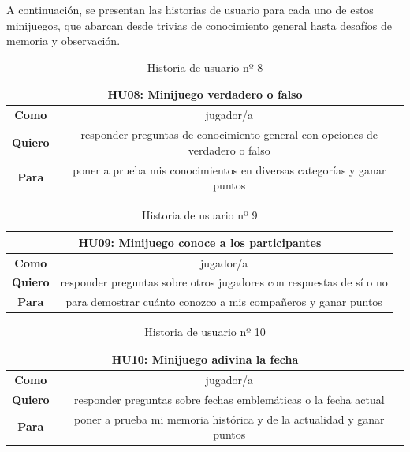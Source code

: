 A continuación, se presentan las historias de usuario para cada uno de estos minijuegos, que abarcan desde trivias de conocimiento general hasta desafíos de memoria y observación.

\begin{table}[H]
	\centering
	\begin{tabular}{|c|c|}
		\hline
		\multicolumn{2}{|c|}{\textbf{HU08}: Minijuego verdadero o falso} \\
		\hline
		\textbf{Como} & jugador/a \\
		\hline
		\textbf{Quiero} & responder preguntas de conocimiento general con opciones de verdadero o falso  \\
		\hline
		\textbf{Para} & poner a prueba mis conocimientos en diversas categorías y ganar puntos \\
		\hline
	\end{tabular}
	\caption{Historia de usuario nº 8}
	\label{tab:HU08}
\end{table}

\begin{table}[H]
	\centering
	\begin{tabular}{|c|c|}
		\hline
		\multicolumn{2}{|c|}{\textbf{HU09}: Minijuego conoce a los participantes} \\
		\hline
		\textbf{Como} & jugador/a \\
		\hline
		\textbf{Quiero} & responder preguntas sobre otros jugadores con respuestas de sí o no  \\
		\hline
		\textbf{Para} & para demostrar cuánto conozco a mis compañeros y ganar puntos \\
		\hline
	\end{tabular}
	\caption{Historia de usuario nº 9}
	\label{tab:HU09}
\end{table}

\begin{table}[H]
	\centering
	\begin{tabular}{|c|c|}
		\hline
		\multicolumn{2}{|c|}{\textbf{HU10}: Minijuego adivina la fecha} \\
		\hline
		\textbf{Como} & jugador/a \\
		\hline
		\textbf{Quiero} & responder preguntas sobre fechas emblemáticas o la fecha actual\\
		\hline
		\textbf{Para} & poner a prueba mi memoria histórica y de la actualidad y ganar puntos \\
		\hline
	\end{tabular}
	\caption{Historia de usuario nº 10}
	\label{tab:HU10}
\end{table}

